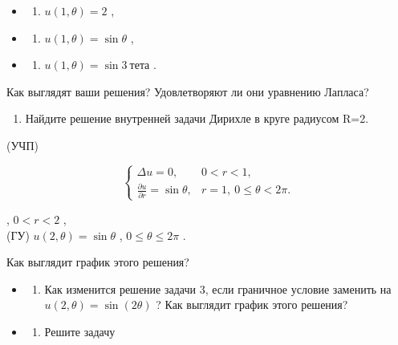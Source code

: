 \documentclass[
  ukrainian,
]{article}
\providecommand{\tightlist}{%
  \setlength{\itemsep}{0pt}\setlength{\parskip}{0pt}}
\begin{document}
\begin{itemize}
\tightlist
\item
  \begin{enumerate}
  \def\labelenumi{\arabic{enumi})}
  \setcounter{enumi}{5}
  \tightlist
  \item
    \(u(1, \theta) = 2\) ,
  \end{enumerate}
\item
  \begin{enumerate}
  \def\labelenumi{\Alph{enumi})}
  \setcounter{enumi}{1}
  \tightlist
  \item
    \(u(1, \theta) = \sin \theta\) ,
  \end{enumerate}
\item
  \begin{enumerate}
  \def\labelenumi{\alph{enumi})}
  \setcounter{enumi}{17}
  \tightlist
  \item
    \(u(1, \theta) = \sin 3\ тета\) .
  \end{enumerate}
\end{itemize}

Как выглядят ваши решения? Удовлетворяют ли они уравнению Лапласа?

\begin{enumerate}
\def\labelenumi{\arabic{enumi}.}
\setcounter{enumi}{2}
\tightlist
\item
  Найдите решение внутренней задачи Дирихле в круге радиусом R=2.
\end{enumerate}

(УЧП)

\[
\begin{cases} \Delta u = 0, & 0 < r < 1, \\ \frac{\partial u}{\partial r} = \sin \theta, & r = 1,\ 0 \le \theta < 2\pi. \end{cases}
\]

, \(0 < r < 2\) ,\\
(ГУ) \(u(2, \theta) = \sin \theta\) , \(0 \le \theta \le 2\pi\) .

Как выглядит график этого решения?

\begin{itemize}
\tightlist
\item
  \begin{enumerate}
  \def\labelenumi{\arabic{enumi}.}
  \setcounter{enumi}{3}
  \tightlist
  \item
    Как изменится решение задачи 3, если граничное условие заменить на
    \(u(2, \theta) = \sin(2\theta)\) ? Как выглядит график этого
    решения?
  \end{enumerate}
\item
  \begin{enumerate}
  \def\labelenumi{\arabic{enumi}.}
  \setcounter{enumi}{4}
  \tightlist
  \item
    Решите задачу
  \end{enumerate}
\end{itemize}
\end{document}
